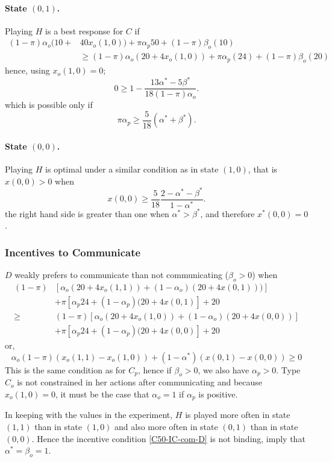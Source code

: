 \documentclass[12pt]{article}
\begin{document}
\paragraph{State $(0,1)$.} Playing $H$ is a best response for $C$ if
\[\begin{split}
	(1-\pi)\alpha_o (10+&40 x_o(1,0))+\pi \alpha_p 50+(1-\pi)\beta_o (10)\\
		&\geq (1-\pi)\alpha_o (20+4 x_o(1,0))+\pi \alpha_p		(24)+(1-\pi)\beta_o (20)
\end{split}
\]
hence, using $x_o(1,0)=0$;  
\[
	0\geq 1-\frac{13\alpha^*-5\beta^*}{18(1-\pi)\alpha_o}.
\]
which is possible only if 
\begin{equation}\label{cond-c50-01}
	\pi\alpha_p\geq \frac{5}{18}(\alpha^*+\beta^*).
\end{equation}


%
\paragraph{State $(0,0)$.} Playing $H$ is optimal under a similar condition as in state $(1,0)$, that is $x(0,0)>0$ when
\[
x(0,0)\geq \frac{5}{18}\frac{2-\alpha^*-\beta^*}{1-\alpha^*}.
\]
the right hand side is greater than one when $\alpha^*>\beta^*$, and therefore $x^*(0,0)=0$.

\subsubsection*{Incentives to Communicate}
$D$ weakly prefers to communicate than not communicating ($\beta_o>0$) when
\[\begin{split}
(1-\pi)&[\alpha_o(20+4 x_o(1,1))+(1-\alpha_o)(20+4x(0,1)))]\\ 
&+\pi [\alpha_p 24+(1-\alpha_p)(20+4x(0,1)]+20\\ 
	\geq	&(1-\pi)[\alpha_o(20+4 x_o(1,0))+(1-\alpha_o)(20+4x(0,0))]\\ 
	&+\pi [\alpha_p 24+(1-\alpha_p)(20+4x(0,0)]+20
\end{split}
\]
or,
\begin{equation}\label{C50-IC-com-D}
\alpha_o (1-\pi) (x_o(1,1)-x_o(1,0))+(1-\alpha^*)(x(0,1)-x(0,0))\geq 0
\end{equation}
%
This is the same condition as for $C_p$, hence if $\beta_o>0$, we also have $\alpha_p>0$. Type $C_o$ is not constrained in her actions after communicating and because $x_o(1,0)=0$, it must be the case that $\alpha_o=1$ if $\alpha_p$ is positive. 

In keeping with the values in the experiment, $H$ is played more often in state $(1,1)$ than in state $(1,0)$ and also more often in state $(0,1)$ than in state $(0,0)$. Hence the incentive condition \eqref{C50-IC-com-D} is not binding, imply that $\alpha^*=\beta_o=1$.
\end{document}
